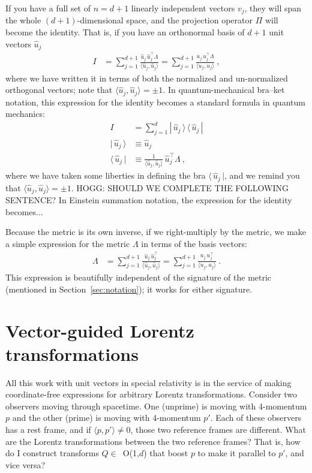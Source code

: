 \documentclass{article}
\newcommand{\inner}[2]{\langle{#1},{#2}\rangle}
\newcommand{\bra}[1]{\langle\,{#1}\,|}
\newcommand{\ket}[1]{|\,{#1}\,\rangle}
\newcommand{\ketbra}[2]{|\,{#1}\,\rangle\,\langle\,{#2}\,|}
\newcommand{\secref}[1]{Section~\ref{#1}}
\begin{document}
If you have a full set of $n=d+1$ linearly independent vectors $v_j$, they will span the whole $(d+1)$-dimensional space, and the projection operator $\Pi$ will become the identity.
That is, if you have an orthonormal basis of $d+1$ unit vectors $\hat{u}_j$
\begin{align}
    I &= \sum_{j=1}^{d+1} \frac{\hat{u}_j\,\hat{u}_j^\top\Lambda}{\inner{\hat{u}_j}{\hat{u}_j}} = \sum_{j=1}^{d+1} \frac{u_j\,u_j^\top\Lambda}{\inner{u_j}{u_j}} ~,
\end{align}
where we have written it in terms of both the normalized and un-normalized orthogonal vectors; note that $\inner{\hat{u}_j}{\hat{u}_j}=\pm 1$.
In quantum-mechanical bra--ket notation, this expression for the identity becomes a standard formula in quantum mechanics:
\begin{align}
    I &= \sum_{j=1}^d \ketbra{\hat{u}_j}{\hat{u}_j}
    \\
    \ket{\hat{u}_j} &\equiv \hat{u}_j
    \\
    \bra{\hat{u}_j} &\equiv \frac{1}{\inner{\hat{u}_j}{\hat{u}_j}}\,\hat{u}_j^\top\Lambda ~,
\end{align}
where we have taken some liberties in defining the bra $\bra{\hat{u}_j}$, and we remind you that $\inner{\hat{u}_j}{\hat{u}_j}=\pm 1$.
HOGG: SHOULD WE COMPLETE THE FOLLOWING SENTENCE? In Einstein summation notation, the expression for the identity becomes...

Because the metric is its own inverse, if we right-multiply by the metric, we make a simple expression for the metric $\Lambda$ in terms of the basis vectors:
\begin{align}
    \Lambda &= \sum_{j=1}^{d+1} \frac{\hat{u}_j\,\hat{u}_j^\top}{\inner{\hat{u}_j}{\hat{u}_j}} = \sum_{j=1}^{d+1} \frac{u_j\,u_j^\top}{\inner{u_j}{u_j}} ~.
\end{align}
This expression is beautifully independent of the signature of the metric (mentioned in \secref{sec:notation}); it works for either signature.

\section{Vector-guided Lorentz transformations}\label{sec:lt}

All this work with unit vectors in special relativity is in the service of making coordinate-free expressions for arbitrary Lorentz transformations.
Consider two observers moving through spacetime.
One (unprime) is moving with 4-momentum $p$ and the other (prime) is moving with 4-momentum $p'$.
Each of these observers has a rest frame, and if $\inner{p}{p'}\neq 0$, those two reference frames are different.
What are the Lorentz transformations between the two reference frames?
That is, how do I construct transforms $Q\in$~O(1,$d$) that boost $p$ to make it parallel to $p'$, and vice versa?
\end{document}

